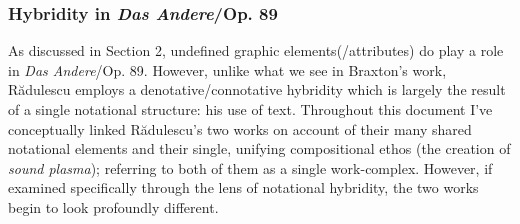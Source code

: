     \subsubsection{Hybridity in \textit{Das Andere}/Op. 89}


        As discussed in Section 2, undefined graphic elements(/attributes) do play a role in \textit{Das Andere}/Op. 89. However, unlike what we see in Braxton's work, R\u{a}dulescu employs a denotative/connotative hybridity which is largely the result of a single notational structure: his use of text. Throughout this document I've conceptually linked R\u{a}dulescu's two works on account of their many shared notational elements and their single, unifying compositional ethos (the creation of \textit{sound plasma}); referring to both of them as a single work-complex. However, if examined specifically through the lens of notational hybridity, the two works begin to look profoundly different. 

